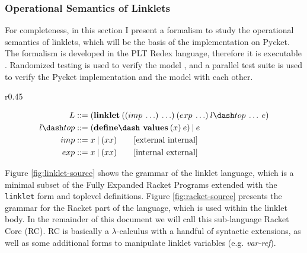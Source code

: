 \subsubsection{Operational Semantics of Linklets}
\label{subsec:linklets-semantics}

For completeness, in this section I present a formalism to study the
operational semantics of linklets, which will be the basis of the
implementation on Pycket. The formalism is developed in the PLT Redex
language, therefore it is executable
\cite{felleisen2009semantics}. Randomized testing is used to verify
the model \cite{random-test:2009}, and a parallel test suite is used
to verify the Pycket implementation and the model with each other.

\begin{wrapfigure}[10]{r}{0.45\textwidth}
  \vspace{-0.5cm}
  \footnotesize
  \begin{mdframed}
    \begin{align*}
      L  &::= (\textbf{linklet}\:((imp\: \ldots)\: \ldots)\:(exp\: \ldots)\:l\dash top\:\ldots\:e)\\
      l\dash top &::= (\textbf{define\dash values}\:(x)\:e)\:|\:e \\
      imp &::= x\:|\:(x x) \tag*{[external internal]}\\
      exp &::= x\:|\:(x x) \tag*{[internal external]}
    \end{align*}
  \caption{Linklet Source Language}
  \label{fig:linklet-source}
  \end{mdframed}
\end{wrapfigure}

Figure \ref{fig:linklet-source} shows the grammar of the linklet
language, which is a minimal subset of the Fully Expanded Racket
Programs extended with the \verb|linklet| form and toplevel
definitions. Figure \ref{fig:racket-source} presents the grammar for
the Racket part of the language, which is used within the linklet
body. In the remainder of this document we will call this sub-language
Racket Core (RC). RC is basically a $\lambda$-calculus with a handful of
syntactic extensions, as well as some additional forms to manipulate
linklet variables (e.g. \emph{var-ref}).

